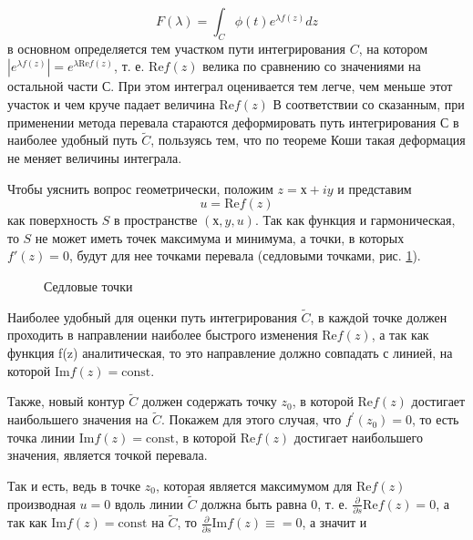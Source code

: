 \documentclass[14pt]{extarticle}
\renewcommand{\Re}{\mathrm{Re}}
\renewcommand{\Im}{\mathrm{Im}}
\newcommand{\const}{\mathrm{const}}
\begin{document}
$$
F(\lambda) = \int_{C}^{}\phi(t)e^{\lambda f(z)}dz
$$
в основном определяется тем участком пути интегрирования $C$, на котором $|e^{\lambda f(z)}|=e^{\lambda \Re f(z)}$, т. е. $\Re f(z)$ велика по сравнению со значениями на остальной части $С$. При этом интеграл оценивается тем легче, чем меньше этот участок и чем круче падает величина $\Re f(z)$ В соответствии со сказанным, при применении метода перевала стараются деформировать путь интегрирования С в наиболее удобный путь $\widetilde{C}$, пользуясь тем, что по теореме Коши такая деформация не меняет величины интеграла.\cite{Lavrentyev}

Чтобы уяснить вопрос геометрически, положим $z = х + iy$ и представим
$$
u = \Re f(z)
$$
как поверхность $S$ в пространстве $(х, y, u)$. Так как функция и гармоническая, то $S$ не может иметь точек максимума и минимума, а точки, в которых $f'(z) = 0$, будут для нее точками перевала (седловыми точками, рис. \ref{ris:image2}).

\begin{figure}[h]
	\caption{Седловые точки}
	\label{ris:image2}
	\end{figure}
	
	Наиболее удобный для оценки путь интегрирования $\widetilde{C}$, в каждой точке должен проходить в направлении наиболее быстрого изменения $\Re f(z)$, а так как функция f(z) аналитическая, то это направление должно совпадать с линией, на которой $\Im f(z) = \const$. 
	
	Также, новый контур $\widetilde{C}$ должен содержать точку $z_0$, в которой $\Re f(z)$ достигает наибольшего значения на $\widetilde{C}$. Покажем для этого случая, что $f^\prime (z_0) = 0$, то есть точка линии $\Im f(z) = \const$, в которой $\Re f (z)$ достигает наибольшего значения, является точкой перевала.
	
	Так и есть, ведь в точке $z_0$, которая является максимумом для $\Re f (z)$ производная $u=0$ вдоль линии $\widetilde{C}$ должна быть равна 0, т. е. $\frac{\partial}{\partial s}\Re f(z)=0$, а так как $\Im f(z) = \const$ на $\widetilde{C}$, то $\frac{\partial}{\partial s} \Im f(z) \equiv = 0$, а значит и 
	
\end{document}
